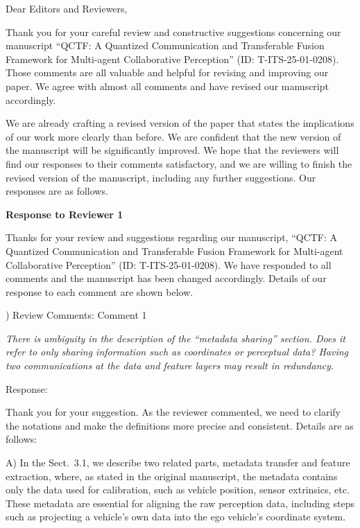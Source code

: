 \documentclass[12pt,a4paper]{article}
\begin{document}

\noindent Dear Editors and Reviewers,

\noindent Thank you for your careful review and constructive suggestions concerning our manuscript ``QCTF: A Quantized Communication and Transferable Fusion Framework for Multi-agent Collaborative Perception'' (ID: T-ITS-25-01-0208). Those comments are all valuable and helpful for revising and improving our paper. We agree with almost all comments and have revised our manuscript accordingly. 

We are already crafting a revised version of the paper that states the implications of our work more clearly than before. We are confident that the new version of the manuscript will be significantly improved. We hope that the reviewers will find our responses to their comments satisfactory, and we are willing to finish the revised version of the manuscript, including any further suggestions. Our responses are as follows.

\clearpage
\noindent \textbf{Response to Reviewer 1}

Thanks for your review and suggestions regarding our manuscript, ``QCTF: A Quantized Communication and Transferable Fusion Framework for Multi-agent Collaborative Perception'' (ID: T-ITS-25-01-0208). We have responded to all comments and the manuscript has been changed accordingly. Details of our response to each comment are shown below.

\vspace{4ex}
) Review Comments: Comment 1

\textit{There is ambiguity in the description of the ``metadata sharing'' section. Does it refer to only sharing information such as coordinates or perceptual data? Having two communications at the data and feature layers may result in redundancy.}

\noindent Response:

Thank you for your suggestion. As the reviewer commented, we need to clarify the notations and make the definitions more precise and consistent.
Details are as follows:

A) In the Sect.~3.1, we describe two related parts, metadata transfer and feature extraction, where, as stated in the original manuscript, the metadata contains only the data used for calibration, such as vehicle position, sensor extrinsics, etc. These metadata are essential for aligning the raw perception data, including steps such as projecting a vehicle's own data into the ego vehicle's coordinate system.
\end{document}
